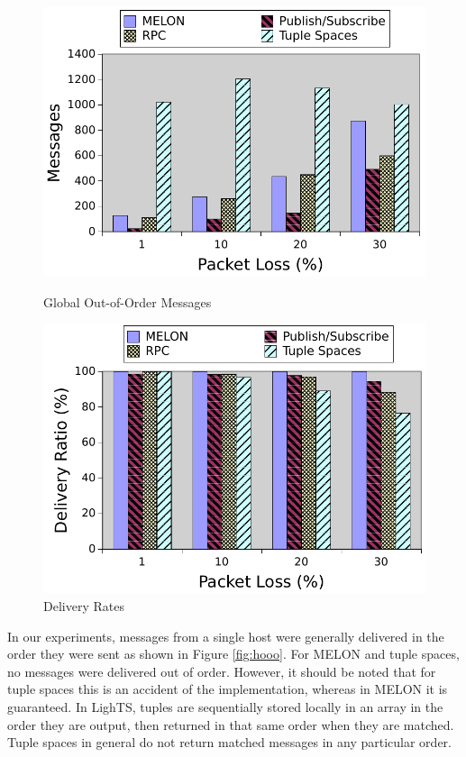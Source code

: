 \begin{figure}[ht]
\centering
\begin{minipage}[b]{0.48\linewidth}
\includegraphics[width = \textwidth]{figures/gooo.pdf}
\caption{Global Out-of-Order Messages}
\label{fig:gooo}
\end{minipage}
\quad
\begin{minipage}[b]{0.48\linewidth}
\includegraphics[width = \textwidth]{figures/delivery.pdf}
\caption{Delivery Rates}
\label{fig:delivery}
\end{minipage}
\end{figure}

In our experiments, messages from a single host were generally delivered in the order they were sent as shown in Figure \ref{fig:hooo}. For MELON and tuple spaces, no messages were delivered out of order. However, it should be noted that for tuple spaces this is an accident of the implementation, whereas in MELON it is guaranteed. In LighTS, tuples are sequentially stored locally in an array in the order they are output, then returned in that same order when they are matched. Tuple spaces in general do not return matched messages in any particular order.

